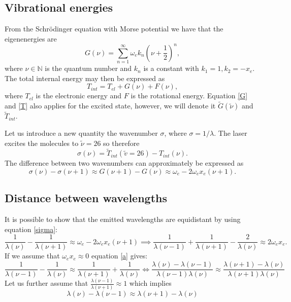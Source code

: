 \documentclass[12pt]{article}
\begin{document}
\subsection{Vibrational energies}
From the Schrödinger equation with Morse potential we have that the eigenenergies are
\begin{equation}
    G(\nu) = \sum_{n=1}^\infty \omega_e k_n \left(\nu + \frac{1}{2} \right)^n,
    \label{G}
\end{equation}
where $\nu \in \mathbb{N}$ is the quantum number and $k_n$ is a constant with $k_1 = 1, k_2 = -x_e$. The total internal energy may then be expressed as
\begin{equation}
    T_{int} = T_{el} + G(\nu) + F(\nu),
    \label{T}
\end{equation}
where $T_{el}$ is the electronic energy and $F$ is the rotational energy. Equation \ref{G} and \ref{T} also applies for the excited state, however, we will denote it $\tilde{G}(\tilde{\nu})$ and $\tilde{T}_{int}$.

Let us introduce a new quantity the wavenumber $\sigma$, where $\sigma = 1/\lambda$. The laser excites the molecules to $\tilde{\nu} = 26$ so therefore
\begin{equation}
    \sigma(\nu) = \tilde{T}_{int}(\tilde{v} = 26) - T_{int}(\nu).
    \label{s}
\end{equation}
The difference between two wavenumbers can approximately be expressed as
\begin{equation}
    \sigma(\nu) - \sigma(\nu + 1) \approx G(\nu + 1) - G(\nu) \approx \omega_e - 2 \omega_e x_e (\nu + 1).
    \label{sigma}
\end{equation}

\subsection{Distance between wavelengths}
It is possible to show that the emitted wavelengths are equidistant by using equation \ref{sigma}:
\begin{equation}
    \frac{1}{\lambda(\nu)} - \frac{1}{\lambda(\nu + 1)} \approx \omega_e - 2 \omega_e x_e (\nu + 1) \implies \frac{1}{\lambda(\nu - 1)} + \frac{1}{\lambda(\nu + 1)} - \frac{2}{\lambda(\nu)} \approx 2 \omega_e x_e.
    \label{a}
\end{equation}
If we assume that $\omega_e x_e \approx 0$ equation \ref{a} gives:
\begin{equation}
        \frac{1}{\lambda(\nu - 1)} -  \frac{1}{\lambda(\nu)} \approx \frac{1}{\lambda(\nu + 1)} + \frac{1}{\lambda(\nu)} \iff
        \frac{\lambda(\nu) - \lambda(\nu - 1)}{\lambda(\nu - 1)\lambda(\nu)} \approx \frac{\lambda(\nu + 1) - \lambda(\nu)}{\lambda(\nu + 1)\lambda(\nu)}
\end{equation}
Let us further assume that $\frac{\lambda(\nu - 1)}{\lambda(\nu + 1)} \approx 1$ which implies
\begin{equation}
    \lambda(\nu) - \lambda(\nu - 1) \approx \lambda(\nu + 1) - \lambda(\nu)
\end{equation}
\end{document}
